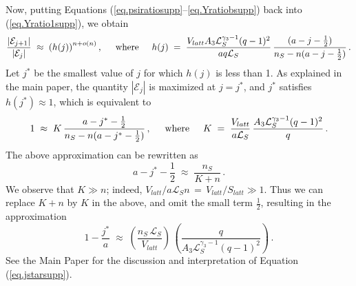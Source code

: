 \documentclass[journal=mamobx,manuscript=article]{achemso}
\newcommand{\leng}{\mathcal{L}}
\begin{document}
Now, putting Equations (\ref{eq.psiratiosupp}--\ref{eq.Yratiobsupp}) back into (\ref{eq.Yratio1supp}), we obtain
\begin{equation}
    \label{eq.Yratio2supp}
       \frac{|\mathcal{E}_{j+1}|}{|\mathcal{E}_j|} \; \approx \; 
       \left( h(j)\right)^{n+o(n)},
       \hspace{5mm}\hbox{where}\hspace{5mm}
       h(j)  \;=\;
       \frac{V_{latt}A_3\leng_S^{\gamma_3-1}(q-1)^2}{aq\leng_S} \,
          \frac{(a-j-\frac{1}{2})}{n_S-n(a-j-\frac{1}{2})}  \,.
\end{equation}
Let $j^*$ be the 
smallest value of $j$ for which $h(j)$ is less than 1.
As explained in the main paper, the quantity $|\mathcal{E}_j|$
is maximized at $j=j^*$, and $j^*$ satisfies 
$h(j^*)\approx 1$, which is equivalent to
\[     1  \;\approx \; 
     K  \,%
          \frac{a-j^*-\frac{1}{2}}{n_S-n(a-j^*-\frac{1}{2})}    \,,  
             \hspace{5mm}\hbox{where}\hspace{5mm}
             K \;=\;   \frac{ V_{latt} }{a\leng_S}\, \frac{   A_3\leng_S^{\gamma_3-1}(q-1)^2}{q} \,.
\]
The above approximation can be rewritten as 
\[       a-j^*-\frac{1}{2} \; \approx\;    \frac{n_S}{K+n}   \,.
\]
We observe that $K\gg n$; indeed,  $V_{latt}/a\leng_S n \,=\,V_{latt}/S_{latt}\gg 1$.  
Thus we can replace $K+n$ by $K$ in the above, and omit the small term $\frac{1}{2}$, resulting in the   
approximation 
\begin{equation}
    \label{eq.jstarsupp}
     1-\frac{j^*}{a}     \; \approx   \; 
        \left(  \frac{n_S\,\leng_S}{V_{latt} }\right) \,\left(   \frac{q}{A_3\leng_S^{\gamma_3-1}(q-1)^2}\right)  \,.
\end{equation}
See the Main Paper for the discussion and interpretation of Equation (\ref{eq.jstarsupp}).
\end{document}
